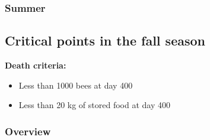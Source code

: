 \documentclass[
	paper=128mm:96mm,
	fontsize=11pt,
	pagesize,
	parskip=half-,
]{scrartcl}
\theoremstyle{mythmstyle} %
\begin{document}
\subsubsection*{Summer}
	\begin{figure}[H]
	\end{figure}
	\clearpage
\subsection*{Critical points in the fall season}
\textbf{Death criteria:}
	\begin{itemize}
		\item Less than 1000 bees at day 400
		\item Less than 20 kg of stored food at day 400
	\end{itemize}
	\clearpage
\subsubsection*{Overview}
	\begin{figure}[H]
	\end{figure}
	\clearpage
\end{document}
